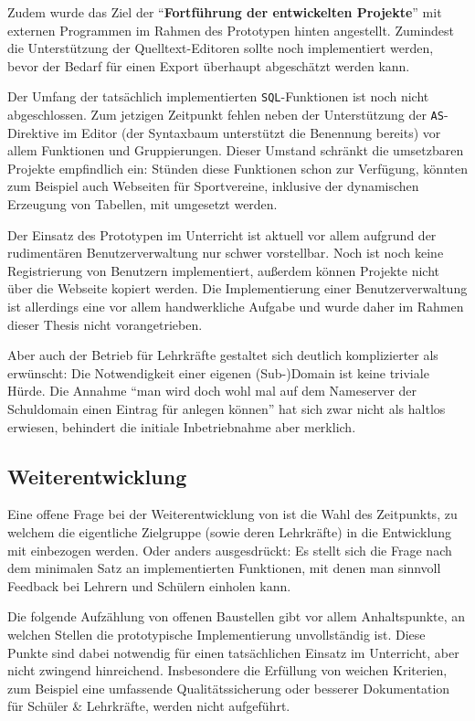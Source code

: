 Zudem wurde das Ziel der "`\textbf{Fortführung der entwickelten Projekte}"' mit externen Programmen im Rahmen des Prototypen hinten angestellt. Zumindest die Unterstützung der Quelltext-Editoren sollte noch implementiert werden, bevor der Bedarf für einen Export überhaupt abgeschätzt werden kann.

Der Umfang der tatsächlich implementierten \texttt{SQL}-Funktionen ist noch nicht abgeschlossen. Zum jetzigen Zeitpunkt fehlen neben der Unterstützung der \texttt{AS}-Direktive im Editor (der Syntaxbaum unterstützt die Benennung bereits) vor allem Funktionen und Gruppierungen. Dieser Umstand schränkt die umsetzbaren Projekte empfindlich ein: Stünden diese Funktionen schon zur Verfügung, könnten zum Beispiel auch Webseiten für Sportvereine, inklusive der dynamischen Erzeugung von Tabellen, mit \idename{} umgesetzt werden.

Der Einsatz des Prototypen im Unterricht ist aktuell vor allem aufgrund der rudimentären Benutzerverwaltung nur schwer vorstellbar. Noch ist noch keine Registrierung von Benutzern implementiert, außerdem können Projekte nicht über die Webseite kopiert werden. Die Implementierung einer Benutzerverwaltung ist allerdings eine vor allem handwerkliche Aufgabe und wurde daher im Rahmen dieser Thesis nicht vorangetrieben.

Aber auch der Betrieb für Lehrkräfte gestaltet sich deutlich komplizierter als erwünscht: Die Notwendigkeit einer eigenen (Sub-)Domain ist keine triviale Hürde. Die Annahme "`man wird doch wohl mal auf dem Nameserver der Schuldomain einen Eintrag für \idename{} anlegen können"' hat sich zwar nicht als haltlos erwiesen, behindert die initiale Inbetriebnahme aber merklich.

\subsection{Weiterentwicklung}

Eine offene Frage bei der Weiterentwicklung von \idename{} ist die Wahl des Zeitpunkts, zu welchem die eigentliche Zielgruppe (sowie deren Lehrkräfte) in die Entwicklung mit einbezogen werden. Oder anders ausgesdrückt: Es stellt sich die Frage nach dem minimalen Satz an implementierten Funktionen, mit denen man sinnvoll Feedback bei Lehrern und Schülern einholen kann.

Die folgende Aufzählung von offenen Baustellen gibt vor allem Anhaltspunkte, an welchen Stellen die prototypische Implementierung unvollständig ist. Diese Punkte sind dabei notwendig für einen tatsächlichen Einsatz im Unterricht, aber nicht zwingend hinreichend. Insbesondere die Erfüllung von weichen Kriterien, zum Beispiel eine umfassende Qualitätssicherung oder besserer Dokumentation für Schüler \& Lehrkräfte, werden nicht aufgeführt.

